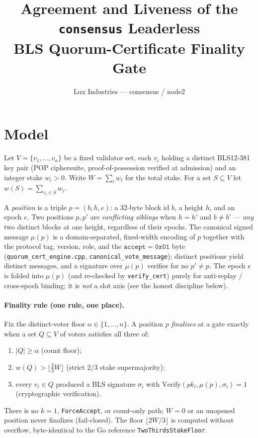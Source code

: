 \documentclass[11pt]{article}
\title{Agreement and Liveness of the \texttt{consensus} Leaderless\\
       BLS Quorum-Certificate Finality Gate}
\author{Lux Industries --- consensus / node2}
\date{}
\begin{document}
\maketitle

\section{Model}

Let $V=\{v_1,\dots,v_n\}$ be a fixed validator set, each $v_i$ holding a distinct
BLS12-381 key pair (POP ciphersuite, proof-of-possession verified at admission) and
an integer stake $w_i>0$. Write $W=\sum_i w_i$ for the total stake. For a set
$S\subseteq V$ let $w(S)=\sum_{v_i\in S} w_i$.

A \emph{position} is a triple $p=(b,h,e)$: a $32$-byte block id $b$, a height $h$,
and an epoch $e$. Two positions $p,p'$ are \emph{conflicting siblings} when
$h=h'$ and $b\neq b'$ --- \emph{any} two distinct blocks at one height, regardless of
their epochs. The canonical signed message
$\mu(p)$ is a domain-separated, fixed-width encoding of $p$ together with the
protocol tag, version, role, and the $\texttt{accept}=\mathtt{0x01}$ byte
(\texttt{quorum\_cert\_engine.cpp}, \texttt{canonical\_vote\_message}); distinct
positions yield distinct messages, and a signature over $\mu(p)$ verifies for no
$p'\neq p$. The epoch $e$ is folded into $\mu(p)$ (and re-checked by
\texttt{verify\_cert}) purely for anti-replay / cross-epoch binding; it is \emph{not}
a slot axis (see the honest discipline below).

\paragraph{Finality rule (one rule, one place).}
Fix the distinct-voter floor $\alpha\in\{1,\dots,n\}$. A position $p$
\emph{finalizes} at a gate exactly when a set $Q\subseteq V$ of voters satisfies all
three of:
\begin{enumerate}
  \item[(C)] $|Q|\ge\alpha$ \hfill (count floor);
  \item[(S)] $w(Q) > \big\lfloor \tfrac{2}{3}W \big\rfloor$ \hfill (strict $2/3$ stake supermajority);
  \item[(V)] every $v_i\in Q$ produced a BLS signature $\sigma_i$ with
        $\mathrm{Verify}(pk_i,\mu(p),\sigma_i)=1$ \hfill (cryptographic verification).
\end{enumerate}
There is no $k{=}1$, \texttt{ForceAccept}, or count-only path; $W=0$ or an unopened
position never finalizes (fail-closed). The floor $\lfloor 2W/3\rfloor$ is computed
without overflow, byte-identical to the Go reference \texttt{TwoThirdsStakeFloor}.
\end{document}
